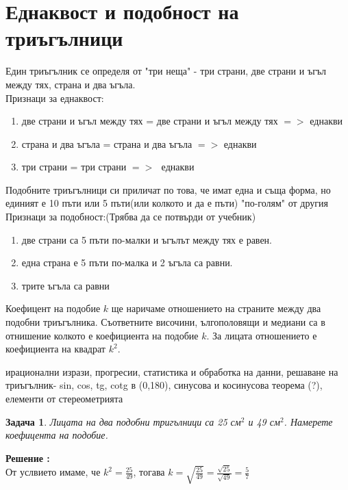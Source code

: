\documentclass{article}
\newtheorem{problem}{Задача}
\newcounter{solution}
\newcommand\solution{%
	\stepcounter{solution}%
	\textbf{Решение :}\\%
}
\begin{document}
		\newpage
	\section{Еднаквост и подобност на триъгълници}	
	
	Един триъгълник се определя от "три неща" - 
	три страни, две страни и ъгъл между тях, страна и два ъгъла. \\
	
	
	Признаци за еднаквост:
	\begin{enumerate}
		\item две страни и ъгъл между тях = две страни и ъгъл между тях $=>$  еднакви
		\item страна и два ъгъла = страна и два ъгъла $=>$  еднакви
		\item три страни = три страни $=>$ $ $ еднакви
	\end{enumerate}

	\vspace{1cm}
	
	
	Подобните триъгълници си приличат по това, че имат една и съща форма, но единият е 10 пъти или 5 пъти(или колкото и да е пъти) "по-голям" от другия \\
	
		Признаци за подобност:(Трябва да се потвърди от учебник)
	\begin{enumerate}
		\item две страни са 5 пъти по-малки и ъгълът между тях е равен.
		\item една страна е 5 пъти по-малка и 2 ъгъла са равни.
 		\item  трите ъгъла са равни
 	\end{enumerate}
	
	Коефицент на подобие $k$ ще наричаме отношението на страните между два подобни триъгълника. Съответните височини, ългополовящи и медиани са в отнишение колкото е коефициента на подобие $k$. За лицата отношението е коефициента на квадрат $k^2$.
	
	\vspace{2cm}
	ирационални изрази, прогресии, статистика и обработка на данни, 
	решаване на триъгълник- sin, cos, tg, cotg в (0,180), синусова и косинусова теорема (?), елементи от стереометрията
	
	\begin{problem}
		Лицата на два подобни тригълници са 25 см$^2$ и 49 см$^2$. Намерете коефицента на подобие.
	\end{problem}
 \solution 
 От услвието имаме, че $k^2 = \frac{25}{49}$, тогава $ k = \sqrt{\frac{25}{49}} = \frac{\sqrt {25}}{ \sqrt {49}} = \frac{5}{7}  $	
	
\end{document}
